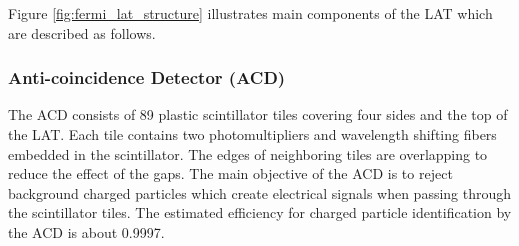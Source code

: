 Figure \ref{fig:fermi_lat_structure} illustrates main components of the LAT
which are described as follows.




\subsubsection{Anti-coincidence Detector (ACD)}
The ACD consists of 89 plastic scintillator tiles covering four
sides and the top of the LAT. Each tile contains two
photomultipliers and wavelength shifting fibers embedded
in the scintillator. The edges of neighboring tiles are
overlapping to reduce the effect of the gaps.
The main objective of the ACD is to reject background
charged particles which create electrical signals when
passing through the scintillator tiles.
The estimated efficiency for charged particle identification
by the ACD is about 0.9997.






